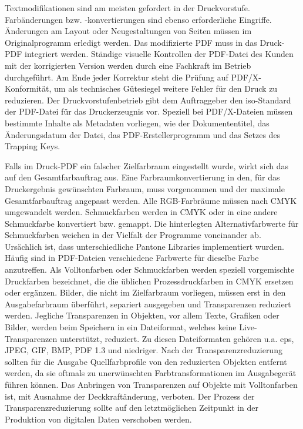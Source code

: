 Textmodifikationen sind am meisten gefordert in der Druckvorstufe. Farbänderungen bzw. -konvertierungen sind ebenso erforderliche Eingriffe. Änderungen am Layout oder Neugestaltungen von Seiten müssen im Originalprogramm erledigt werden. Das modifizierte PDF muss in das Druck-PDF integriert werden. Ständige visuelle Kontrollen der PDF-Datei des Kunden mit der korrigierten Version werden durch eine Fachkraft im Betrieb durchgeführt. Am Ende jeder Korrektur steht die Prüfung auf PDF/X-Konformität, um als technisches Gütesiegel weitere Fehler für den Druck zu reduzieren. Der Druckvorstufenbetrieb gibt dem Auftraggeber den \gls{iso}-Standard der PDF-Datei für das Druckerzeugnis vor. Speziell bei PDF/X-Dateien müssen bestimmte Inhalte als Metadaten vorliegen, wie der Dokumententitel, das Änderungsdatum der Datei, das PDF-Erstellerprogramm und das Setzes des Trapping Keys. 
\par
Falls im Druck-PDF ein falscher Zielfarbraum eingestellt wurde, wirkt sich das auf den Gesamtfarbauftrag aus. Eine Farbraumkonvertierung in den, für das Druckergebnis gewünschten Farbraum, muss vorgenommen und der maximale Gesamtfarbauftrag angepasst werden. Alle RGB-Farbräume müssen nach CMYK umgewandelt werden. Schmuckfarben werden in CMYK oder in eine andere Schmuckfarbe konvertiert bzw. gemappt. Die hinterlegten Alternativfarbwerte für Schmuckfarben weichen in der Vielfalt der Programme voneinander ab. Ursächlich ist, dass unterschiedliche Pantone Libraries implementiert wurden. Häufig sind in PDF-Dateien verschiedene Farbwerte für dieselbe Farbe anzutreffen. Als Volltonfarben oder Schmuckfarben werden speziell vorgemischte Druckfarben bezeichnet, die die üblichen Prozessdruckfarben in CMYK ersetzen oder ergänzen. Bilder, die nicht im Zielfarbraum vorliegen, müssen erst in den Ausgabefarbraum überführt, separiert ausgegeben und Transparenzen reduziert werden. Jegliche Transparenzen in Objekten, vor allem Texte, Grafiken oder Bilder, werden beim Speichern in ein Dateiformat, welches keine Live-Transparenzen unterstützt, reduziert. Zu diesen Dateiformaten gehören u.a. \gls{eps}, JPEG, GIF, BMP, PDF 1.3 und niedriger. Nach der Transparenzreduzierung sollten für die Ausgabe Quellfarbprofile von den reduzierten Objekten entfernt werden, da sie oftmals zu unerwünschten Farbtransformationen im Ausgabegerät führen können. Das Anbringen von Transparenzen auf Objekte mit Volltonfarben ist, mit Ausnahme der Deckkraftänderung, verboten. Der Prozess der Transparenzreduzierung sollte auf den letztmöglichen Zeitpunkt in der Produktion von digitalen Daten verschoben werden.
